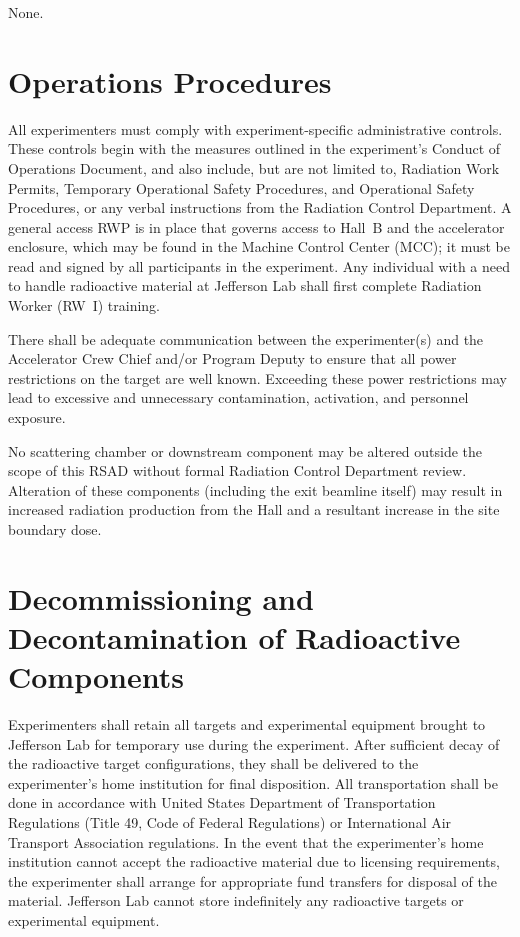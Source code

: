 \documentclass [12pt]{article}
\begin{document}
None.

\section{Operations Procedures}

All experimenters must comply with experiment-specific administrative controls. These controls 
begin with the measures outlined in the experiment's Conduct of Operations Document, and also 
include, but are not limited to, Radiation Work Permits, Temporary Operational Safety Procedures, 
and Operational Safety Procedures, or any verbal instructions from the Radiation Control 
Department. A general access RWP is in place that governs access to Hall~B and the accelerator 
enclosure, which may be found in the Machine Control Center (MCC); it must be read and signed by 
all participants in the experiment. Any individual with a need to handle radioactive material at 
Jefferson Lab shall first complete Radiation Worker (RW~I) training.

There shall be adequate communication between the experimenter(s) and the Accelerator Crew Chief 
and/or Program Deputy to ensure that all power restrictions on the target are well known. Exceeding 
these power restrictions may lead to excessive and unnecessary contamination, activation, and 
personnel exposure. 

No scattering chamber or downstream component may be altered outside the scope of this RSAD 
without formal Radiation Control Department review. Alteration of these components (including 
the exit beamline itself) may result in increased radiation production from the Hall and a 
resultant increase in the site boundary dose. 

\section{Decommissioning and Decontamination of Radioactive Components}

Experimenters shall retain all targets and experimental equipment brought to Jefferson Lab for 
temporary use during the experiment. After sufficient decay of the radioactive target 
configurations, they shall be delivered to the experimenter's home institution for final 
disposition. All transportation shall be done in accordance with United States Department of 
Transportation Regulations (Title 49, Code of Federal Regulations) or International Air Transport
Association regulations. In the event that the experimenter's home institution cannot accept the 
radioactive material due to licensing requirements, the experimenter shall arrange for appropriate 
fund transfers for disposal of the material. Jefferson Lab cannot store indefinitely any radioactive 
targets or experimental equipment. 
\end{document}
